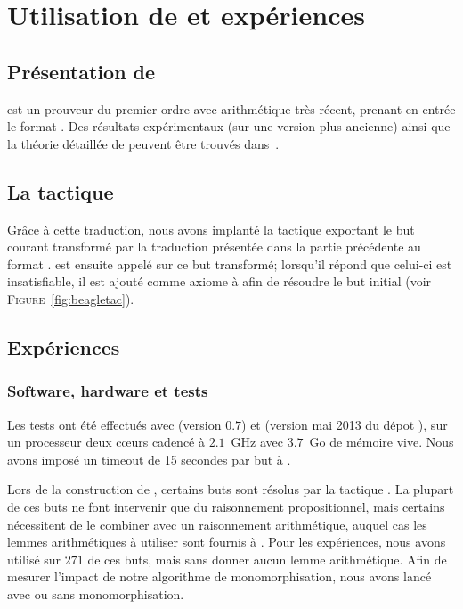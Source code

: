 \section{Utilisation de \beagle et expériences}
\label{sec:experiences}

\subsection{Présentation de \beagle}
\beagle est un prouveur du premier ordre avec arithmétique très récent,
prenant en entrée le format \tff. Des résultats expérimentaux (sur une
version plus ancienne) ainsi que la théorie détaillée de \beagle peuvent être trouvés dans~\cite{DBLP:conf/cade/BaumgartnerW13}.


\subsection{La tactique \beagletac}
\label{sec:experiences:beagletac}

Grâce à cette traduction, nous avons implanté la tactique \beagletac
exportant le but courant transformé par la traduction présentée dans la
partie précédente au format \tff. \beagle est ensuite appelé sur ce but
transformé; lorsqu'il répond que celui-ci est insatisfiable, il est
ajouté comme axiome à \holfour afin de résoudre le but initial (voir
\textsc{Figure}~\ref{fig:beagletac}).


\subsection{Expériences}
\label{sec:experiences:experiences}

\subsubsection{Software, hardware et tests}
Les tests ont été effectués avec \beagle (version $0.7$) et \holfour (version mai 2013 du dépot ), sur un processeur deux cœurs cadencé à $2.1$~GHz avec $3.7$~Go de mémoire vive.
Nous avons imposé un timeout de 15 secondes par but à \beagle.

Lors de la construction de \holfour, certains buts sont résolus par la
tactique \metistac. La plupart de ces buts ne font intervenir que du
raisonnement propositionnel, mais certains nécessitent de le combiner
avec un raisonnement arithmétique, auquel cas les lemmes arithmétiques à
utiliser sont fournis à \metistac. Pour les expériences, nous avons
utilisé \beagletac sur $271$ de ces buts, mais sans donner aucun lemme
arithmétique. Afin de mesurer l'impact de notre algorithme de
monomorphisation, nous avons lancé \beagletac avec ou sans
monomorphisation.

